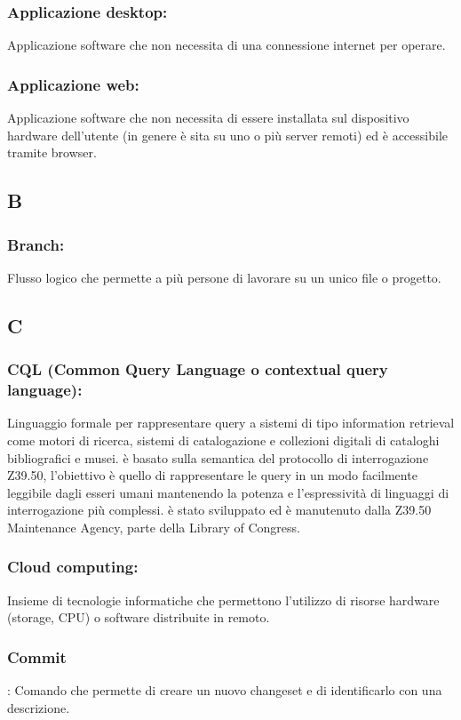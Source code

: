 \subsubsection*{Applicazione desktop:} Applicazione software che non necessita
di una connessione internet per operare.

\subsubsection*{Applicazione web:} Applicazione software che non necessita di
essere installata sul dispositivo hardware dell'utente (in genere \`e sita su uno o pi\`u server
remoti) ed \`e accessibile tramite browser.

\subsection*{\huge{B}}
\subsubsection*{Branch:}  Flusso logico che permette a pi\`u persone di lavorare
su un unico file o progetto.
\subsection*{\huge{C}}
\subsubsection*{CQL (Common Query Language o contextual query language):}
Linguaggio formale per rappresentare query a sistemi di tipo information
retrieval come motori di ricerca, sistemi di catalogazione e collezioni digitali di cataloghi
bibliografici e musei. \`e basato sulla semantica del protocollo di interrogazione
Z39.50, l'obiettivo \`e quello di rappresentare le query in un modo facilmente
leggibile dagli esseri umani mantenendo la potenza e l'espressivit\`a di linguaggi
di interrogazione pi\`u complessi. \`e stato sviluppato ed \`e manutenuto dalla Z39.50
Maintenance Agency, parte della Library of Congress.

\subsubsection*{Cloud computing:} Insieme di tecnologie informatiche che
permettono l'utilizzo di risorse hardware (storage, CPU) o software distribuite in remoto.

\subsubsection*{Commit}: Comando che permette di creare un nuovo changeset e di
identificarlo con una descrizione.

